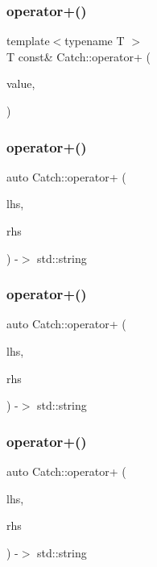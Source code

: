 \subsubsection{operator+()\hspace{0.1cm}{\footnotesize\ttfamily [1/4]}}
{\footnotesize\ttfamily template$<$typename T $>$ \\
T const\& Catch\+::operator+ (\begin{DoxyParamCaption}\item[{T const \&}]{value,  }\item[{\textbf{ Stream\+End\+Stop}}]{ }\end{DoxyParamCaption})}

\mbox{\label{namespace_catch_a3a766cb0b8c792c9151baaaf1e8003eb}} 
\subsubsection{operator+()\hspace{0.1cm}{\footnotesize\ttfamily [2/4]}}
{\footnotesize\ttfamily auto Catch\+::operator+ (\begin{DoxyParamCaption}\item[{\textbf{ String\+Ref} const \&}]{lhs,  }\item[{\textbf{ String\+Ref} const \&}]{rhs }\end{DoxyParamCaption}) -\/$>$  std\+::string}

\mbox{\label{namespace_catch_ab7bdb68d0e4329df79e293f9207b55e9}} 
\subsubsection{operator+()\hspace{0.1cm}{\footnotesize\ttfamily [3/4]}}
{\footnotesize\ttfamily auto Catch\+::operator+ (\begin{DoxyParamCaption}\item[{\textbf{ String\+Ref} const \&}]{lhs,  }\item[{char const $\ast$}]{rhs }\end{DoxyParamCaption}) -\/$>$  std\+::string}

\mbox{\label{namespace_catch_a764a678121fa11c590a53618baa47680}} 
\subsubsection{operator+()\hspace{0.1cm}{\footnotesize\ttfamily [4/4]}}
{\footnotesize\ttfamily auto Catch\+::operator+ (\begin{DoxyParamCaption}\item[{char const $\ast$}]{lhs,  }\item[{\textbf{ String\+Ref} const \&}]{rhs }\end{DoxyParamCaption}) -\/$>$  std\+::string}


